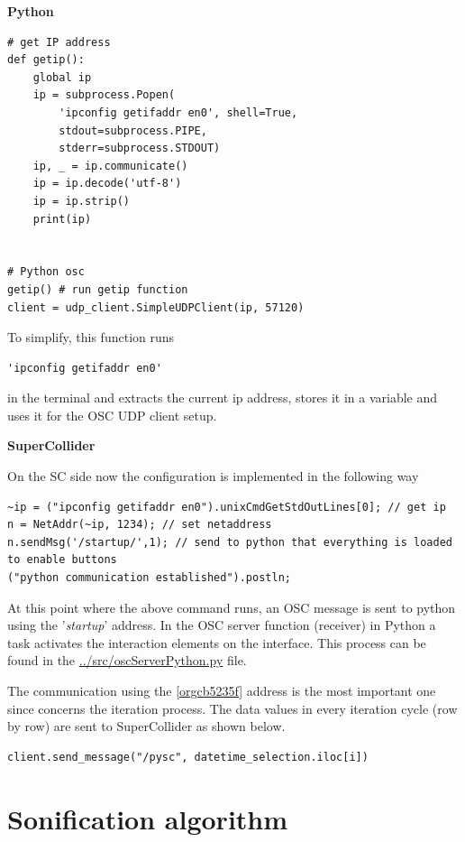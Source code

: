 \documentclass[11pt]{article}
\begin{document}
\textbf{Python}

\begin{verbatim}
# get IP address
def getip():
    global ip
    ip = subprocess.Popen(
        'ipconfig getifaddr en0', shell=True,
        stdout=subprocess.PIPE,
        stderr=subprocess.STDOUT)
    ip, _ = ip.communicate()
    ip = ip.decode('utf-8')
    ip = ip.strip()
    print(ip)


# Python osc
getip() # run getip function
client = udp_client.SimpleUDPClient(ip, 57120)
\end{verbatim}

To simplify, this function runs
\begin{verbatim}
'ipconfig getifaddr en0'
\end{verbatim}
in the terminal and extracts the current ip address, stores it in a variable and uses it for the OSC UDP client setup.

\textbf{SuperCollider}

On the SC side now the configuration is implemented in the following way
\begin{verbatim}
~ip = ("ipconfig getifaddr en0").unixCmdGetStdOutLines[0]; // get ip
n = NetAddr(~ip, 1234); // set netaddress
n.sendMsg('/startup/',1); // send to python that everything is loaded to enable buttons
("python communication established").postln;
\end{verbatim}

At this point where the above command runs, an OSC message is sent to python using the '\emph{startup}' address.  In the OSC server function (receiver) in Python a task activates the interaction elements on the interface.  This process can be found in the \url{../src/oscServerPython.py} file.

The communication using the \ref{orgcb5235f} address is the most important one since concerns the iteration process.  The data values in every iteration cycle (row by row) are sent to SuperCollider as shown below.

\begin{verbatim}
client.send_message("/pysc", datetime_selection.iloc[i])
\end{verbatim}
\section{Sonification algorithm}
\label{sec:org1d9399a}
\end{document}
